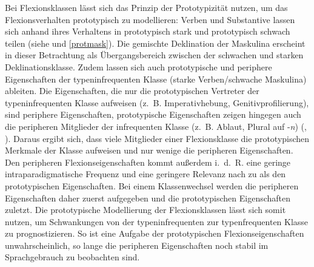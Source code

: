 Bei Flexionsklassen lässt sich das Prinzip der Prototypizität nutzen, um das Flexionsverhalten prototypisch zu modellieren: Verben und Substantive lassen sich anhand ihres Verhaltens in prototypisch stark und prototypisch schwach teilen (siehe  und \ref{protmask}). Die gemischte Deklination der Maskulina erscheint in dieser Betrachtung als Übergangsbereich zwischen der schwachen und starken Deklinationsklasse. Zudem lassen sich auch prototypische und periphere Eigenschaften der typeninfrequenten Klasse (starke Verben/schwache Maskulina) ableiten. Die Eigenschaften, die nur die prototypischen Vertreter der typeninfrequenten Klasse aufweisen (z.~B. Imperativhebung, Genitivprofilierung), sind periphere Eigenschaften, prototypische Eigenschaften zeigen hingegen auch die peripheren Mitglieder der infrequenten Klasse (z.~B. Ablaut, Plural auf -\textit{n}) (\cite[57]{Bittner.1985}, \cite[157]{Nowak.2013}). Daraus ergibt sich, dass viele Mitglieder einer Flexionsklasse die prototypischen Merkmale der Klasse aufweisen und nur wenige die peripheren Eigenschaften. Den peripheren Flexionseigenschaften kommt außerdem i.~d.~R. eine geringe intraparadigmatische Frequenz und eine geringere Relevanz nach \textcite{Bybee.1985} zu als den prototypischen Eigenschaften. Bei einem Klassenwechsel werden die peripheren Eigenschaften daher zuerst aufgegeben und die prototypischen Eigenschaften zuletzt. Die prototypische Modellierung der Flexionsklassen lässt sich somit nutzen, um Schwankungen von der typeninfrequenten zur typenfrequenten Klasse zu prognostizieren. So ist eine Aufgabe der prototypischen Flexionseigenschaften unwahrscheinlich, so lange die peripheren Eigenschaften noch stabil im Sprachgebrauch zu beobachten sind.

